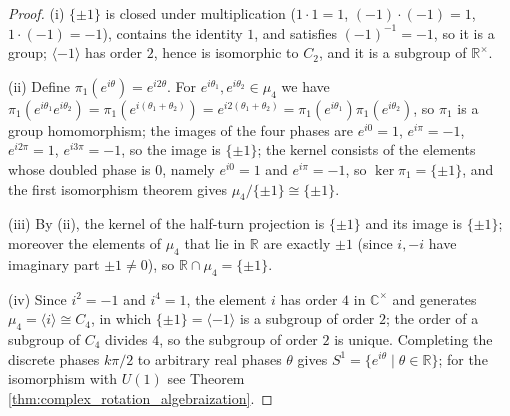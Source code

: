 \begin{proof}
(i) $\{\pm1\}$ is closed under multiplication ($1\cdot1=1$, $(-1)\cdot(-1)=1$, $1\cdot(-1)=-1$), contains the identity $1$, and satisfies $(-1)^{-1}=-1$, so it is a group; $\langle-1\rangle$ has order $2$, hence is isomorphic to $C_2$, and it is a subgroup of $\mathbb{R}^\times$.

(ii) Define $\pi_1(e^{i\theta})=e^{i2\theta}$. For $e^{i\theta_1},e^{i\theta_2}\in\mu_4$ we have $\pi_1(e^{i\theta_1}e^{i\theta_2})=\pi_1(e^{i(\theta_1+\theta_2)})=e^{i2(\theta_1+\theta_2)}=\pi_1(e^{i\theta_1})\pi_1(e^{i\theta_2})$, so $\pi_1$ is a group homomorphism; the images of the four phases are $e^{i0}=1$, $e^{i\pi}=-1$, $e^{i2\pi}=1$, $e^{i3\pi}=-1$, so the image is $\{\pm1\}$; the kernel consists of the elements whose doubled phase is $0$, namely $e^{i0}=1$ and $e^{i\pi}=-1$, so $\ker\pi_1=\{\pm1\}$, and the first isomorphism theorem gives $\mu_4/\{\pm1\}\cong\{\pm1\}$.

(iii) By (ii), the kernel of the half-turn projection is $\{\pm1\}$ and its image is $\{\pm1\}$; moreover the elements of $\mu_4$ that lie in $\mathbb{R}$ are exactly $\pm1$ (since $i,-i$ have imaginary part $\pm1\neq0$), so $\mathbb{R}\cap\mu_4=\{\pm1\}$.

(iv) Since $i^2=-1$ and $i^4=1$, the element $i$ has order $4$ in $\mathbb{C}^{\times}$ and generates $\mu_4=\langle i\rangle\cong C_4$, in which $\{\pm1\}=\langle-1\rangle$ is a subgroup of order $2$; the order of a subgroup of $C_4$ divides $4$, so the subgroup of order $2$ is unique. Completing the discrete phases $k\pi/2$ to arbitrary real phases $\theta$ gives $S^1=\{e^{i\theta}\mid\theta\in\mathbb{R}\}$; for the isomorphism with $U(1)$ see Theorem \ref{thm:complex_rotation_algebraization}.
\end{proof}

